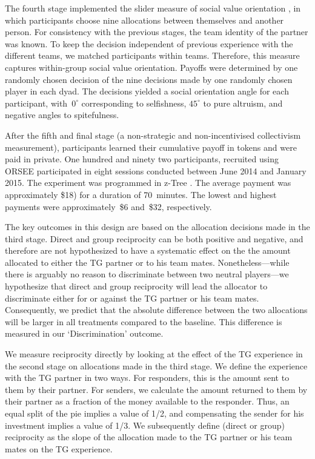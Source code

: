 \documentclass[12pt,a4paper]{article}\usepackage[]{graphicx}\usepackage[]{color}
\begin{document}
The fourth stage implemented the slider measure of social value orientation
\citep*{murphy2011measuring,crosetto2012flexible}, in which participants
choose nine allocations between themselves and another person. For
consistency with the previous stages, the team identity of the partner
was known. To keep the decision independent of previous experience
with the different teams, we matched participants within teams. Therefore, this measure captures within-group social value orientation. Payoffs
were determined by one randomly chosen decision of the nine decisions
made by one randomly chosen player in each dyad. The decisions yielded
a social orientation angle for each participant, with~$0^{\circ}$
corresponding to selfishness, $45^{\circ}$ to pure altruism, and
negative angles to spitefulness.

After the fifth and final stage (a non-strategic and non-incentivised
collectivism measurement), participants learned their cumulative payoff in tokens and were paid in private.
One hundred and ninety two participants, recruited using ORSEE \citep*{greiner2015subject} participated in eight sessions conducted between June 2014 and January
2015. %
The experiment was programmed in z-Tree \citep*{Fischbacher2007}. 
The average payment was approximately \$18) for a duration of 70~minutes. The lowest and highest payments were approximately~\$6 and~\$32, respectively.

The key outcomes in this design are based on the allocation decisions made in the third stage. Direct and group reciprocity can be both positive and negative, and therefore are not hypothesized to have a systematic effect on the the amount allocated to either the TG partner or to his team mates. Nonetheless---while there is arguably no reason to discriminate between two neutral players---we hypothesize that direct and group reciprocity will lead the allocator to discriminate either for or against the TG partner or his team mates. Consequently, we predict that the absolute difference between the two allocations will be larger in all treatments compared to the baseline. This difference is measured in our `Discrimination' outcome.

We measure reciprocity directly by looking at the effect of the TG experience in the second stage on allocations made in the third stage. We define the experience with the TG partner in two ways. For responders, this is the amount sent to them by their partner. For senders, we calculate the amount returned to them by their partner as a fraction of the money available to the responder. Thus, an equal split of the pie implies a value of 1/2, and compensating the sender for his investment implies a value of 1/3. We subsequently define (direct or group) reciprocity as the slope of the allocation made to the TG partner or his team mates on the TG experience.
\end{document}
